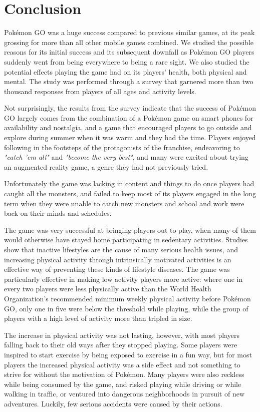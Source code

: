 \chapter{Conclusion}
Pokémon GO was a huge success compared to previous similar games, at its peak grossing for more than all other mobile games combined. We studied the possible reasons for its initial success and its subsequent downfall as Pokémon GO players suddenly went from being everywhere to being a rare sight. We also studied the potential effects playing the game had on its players' health, both physical and mental. The study was performed through a survey that garnered more than two thousand responses from players of all ages and activity levels.

Not surprisingly, the results from the survey indicate that the success of Pokémon GO largely comes from the combination of a Pokémon game on smart phones for availability and nostalgia, and a game that encouraged players to go outside and explore during summer when it was warm and they had the time. Players enjoyed following in the footsteps of the protagonists of the franchise, endeavoring to \emph{"catch 'em all"} and \emph{"become the very best"}, and many were excited about trying an augmented reality game, a genre they had not previously tried.

Unfortunately the game was lacking in content and things to do once players had caught all the monsters, and failed to keep most of its players engaged in the long term when they were unable to catch new monsters and school and work were back on their minds and schedules.

The game was very successful at bringing players out to play, when many of them would otherwise have stayed home participating in sedentary activities. Studies show that inactive lifestyles are the cause of many serious health issues, and increasing physical activity through intrinsically motivated activities is an effective way of preventing these kinds of lifestyle diseases. The game was particularly effective in making low activity players more active: where one in every two players were less physically active than the World Health Organization's recommended minimum weekly physical activity before Pokémon GO, only one in five were below the threshold while playing, while the group of players with a high level of activity more than tripled in size.

The increase in physical activity was not lasting, however, with most players falling back to their old ways after they stopped playing. Some players were inspired to start exercise by being exposed to exercise in a fun way, but for most players the increased physical activity was a side effect and not something to strive for without the motivation of Pokémon. Many players were also reckless while being consumed by the game, and risked playing while driving or while walking in traffic, or ventured into dangerous neighborhoods in pursuit of new adventures. Luckily, few serious accidents were caused by their actions.

